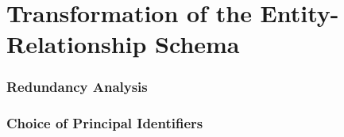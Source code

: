 \section{Transformation of the Entity-Relationship Schema}

\subsubsection{Redundancy Analysis}

\subsubsection{Choice of Principal Identifiers}